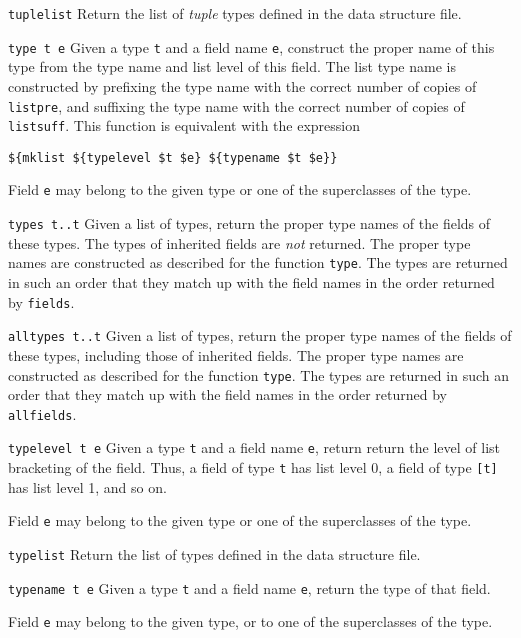 \begin{desctab}
\item[\texttt{tuplelist}]
Return the list of \emph{tuple} types defined in the data structure file.

\item[\texttt{type t e}]
Given a type \texttt{t} and a field name \texttt{e}, construct the proper
name of this type from the type name and list level of this field.
The list type name is constructed by prefixing the type name with the
correct number of copies of \texttt{listpre}, and suffixing the
type name with the correct number of copies of \texttt{listsuff}.
This function is equivalent with the expression
\begin{verbatim}
${mklist ${typelevel $t $e} ${typename $t $e}}
\end{verbatim}

Field \texttt{e} may belong to the given type or one of the superclasses
of the type.

\item[\texttt{types t..t}]
Given a list of types, return the proper type names of the fields of
these types. The types of inherited fields are \emph{not} returned.
The proper type names are constructed as described for the function
\texttt{type}.
The types are returned in such an order that they match up with the
field names in the order returned by \texttt{fields}.

\item[\texttt{alltypes t..t}]
Given a list of types, return the proper type names of the fields of
these types, including those of inherited fields.
The proper type names are constructed as described for the function
\texttt{type}.
The types are returned in such an order that they match up with the
field names in the order returned by \texttt{allfields}.

\item[\texttt{typelevel t e}]
Given a type \texttt{t} and a field name \texttt{e}, return return the level
of list bracketing of the field. Thus, a field of type \verb't' has list
level 0, a field of type \verb'[t]' has list level 1, and so on.

Field \texttt{e} may belong to the given type or one of the superclasses
of the type.

\item[\texttt{typelist}]
Return the list of types defined in the data structure file.

\item[\texttt{typename t e}]
Given a type \texttt{t} and a field name \texttt{e}, return the
type of that field.

Field \texttt{e} may belong to the given type, or to one of the
superclasses of the type.

\end{desctab}
